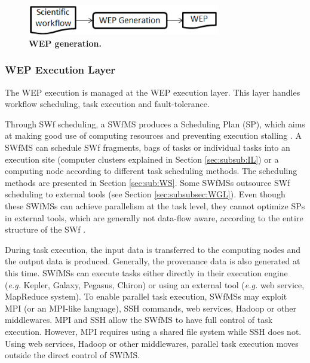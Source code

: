 \begin{figure}
\begin{centering}
\captionsetup{justification=centering}
\includegraphics[width=84mm]{figures/f20}
\par\end{centering}
\caption{\textbf{WEP generation. }}
\label{fig:f20} 
\end{figure}

\subsubsection{WEP Execution Layer}
\label{sec:subsubsec:WEL}

The WEP execution is managed at the WEP execution layer. This layer handles workflow scheduling, task execution and fault-tolerance.

Through SWf scheduling, a SWfMS produces a Scheduling Plan (SP), which aims at making good use of computing resources and preventing execution stalling \cite{Bouganim2000}.
A SWfMS can schedule SWf fragments, bags of tasks or individual tasks into an execution site 
(computer clusters explained in Section \ref{sec:subsub:IL}) or a computing node according to different task scheduling methods. 
The scheduling methods are presented in Section \ref{sec:sub:WS}. 
Some SWfMSs outsource SWf scheduling to external tools (see Section \ref{sec:subsubsec:WGL}).
Even though these SWfMSs can achieve parallelism at the task level, they cannot optimize SPs in external tools, 
which are generally not data-flow aware, according to the entire structure of the SWf \cite{Dias2013}. 

During task execution, the input data is transferred to the computing nodes and the output data is produced.
Generally, the provenance data is also generated at this time.
SWfMSs can execute tasks either directly in their execution engine (\textit{e.g.} Kepler, Galaxy, Pegasus, Chiron) 
or using an external tool (\textit{e.g.} web service, MapReduce system).
To enable parallel task execution, SWfMSs may exploit MPI (or an
MPI-like language), SSH commands, web services, Hadoop or
other middlewares.
MPI and SSH allow the SWfMS to have full control of task execution. 
However, MPI requires using a shared file system while SSH does not.
Using web services, Hadoop
or other middlewares, parallel task execution moves outside the
direct control of SWfMS.


